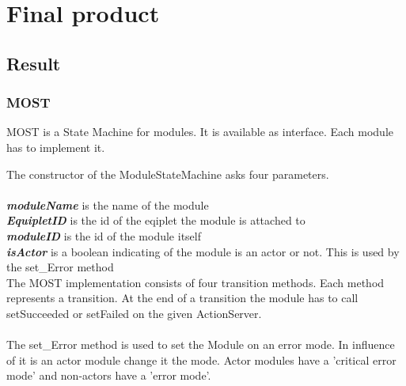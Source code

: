 \documentclass[12pt,a4paper]{report}
\begin{document}
\chapter{Final product}
\section{Result}
\subsection{MOST}

\begin{figure}
\end{figure}

MOST is a State Machine for modules.
It is available as interface.
Each module has to implement it. 

The constructor of the ModuleStateMachine asks four parameters. \\
\\
\textbf{\textit{moduleName}} is the name of the module \\
\textbf{\textit{EquipletID}} is the id of the eqiplet the module is attached to \\
\textbf{\textit{moduleID}} is the id of the module itself \\
\textbf{\textit{isActor}} is a boolean indicating of the module is an actor or not. This is used by the set\_Error method \\

\noindent
The MOST implementation consists of four transition methods.
Each method represents a transition.
At the end of a transition the module has to call setSucceeded or setFailed on the given ActionServer.
\\\\
The set\_Error method is used to set the Module on an error mode. In influence of it is an actor module change it the mode. Actor modules have a 'critical error mode' and non-actors have a 'error mode'.
\end{document}

